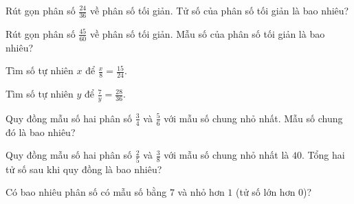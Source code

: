 
\begin{ex}
  Rút gọn phân số $\frac{24}{36}$ về phân số tối giản. Tử số của phân số tối giản là bao nhiêu?
\end{ex}

\begin{ex}
  Rút gọn phân số $\frac{45}{60}$ về phân số tối giản. Mẫu số của phân số tối giản là bao nhiêu?
\end{ex}

\begin{ex}
  Tìm số tự nhiên $x$ để $\frac{x}{8} = \frac{15}{24}$.
\end{ex}

\begin{ex}
  Tìm số tự nhiên $y$ để $\frac{7}{y} = \frac{28}{36}$.
\end{ex}

\begin{ex}
  Quy đồng mẫu số hai phân số $\frac{3}{4}$ và $\frac{5}{6}$ với mẫu số chung nhỏ nhất. Mẫu số chung đó là bao nhiêu?
\end{ex}

\begin{ex}
  Quy đồng mẫu số hai phân số $\frac{2}{5}$ và $\frac{3}{8}$ với mẫu số chung nhỏ nhất là $40$. Tổng hai tử số sau khi quy đồng là bao nhiêu?
\end{ex}

\begin{ex}
  Có bao nhiêu phân số có mẫu số bằng $7$ và nhỏ hơn $1$ (tử số lớn hơn $0$)?
\end{ex}

